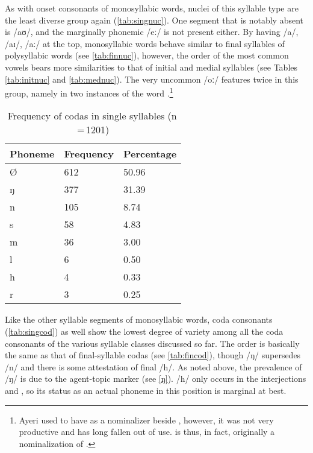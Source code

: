 As with onset consonants of monosyllabic words, nuclei of this syllable type 
are the least diverse group again (\autoref{tab:singnuc}). One segment that is 
notably absent is /aʊ/, and the marginally phonemic /eː/ is not present either. 
By having /a/, /aɪ/, /aː/ at the top, monosyllabic words behave similar to 
final syllables of polysyllabic words (see \autoref{tab:finnuc}), however, the 
order of the most common vowels bears more similarities to that of initial and 
medial syllables (see Tables \ref{tab:initnuc} and \ref{tab:mednuc}). The very 
uncommon /oː/ features twice in this group, namely in two instances of the word 
.\footnote{Ayeri used to have  
as a nominalizer beside , however, it was not very productive and 
has long fallen out of use.  is thus, in fact, originally a 
nominalization of .}

\begin{table}[pth]\centering
\caption[Frequency of codas in single syllables]{Frequency of codas in single syllables (n\,=\,1201)}
\begin{tabu} to 0.5\textwidth{X X[c] X[c]}
\tableheaderfont\toprule
Phoneme
	& Frequency
	& Percentage
	\\
	
\toprule

Ø
	& 612
	& 50.96\pct\\

\midrule

ŋ
	& 377
	& 31.39\pct\\
n
	& 105
	& 8.74\pct\\
s
	& 58
	& 4.83\pct\\
m
	& 36
	& 3.00\pct\\
l
	& 6
	& 0.50\pct\\
h
	& 4
	& 0.33\pct\\
r
	& 3
	& 0.25\pct\\

\bottomrule
\end{tabu}
\label{tab:singcod}
\end{table}

Like the other syllable segments of monosyllabic words, coda consonants 
(\autoref{tab:singcod}) as well show the lowest degree of variety among all the 
coda consonants of the various syllable classes discussed so far. The order is 
basically the same as that of final-syllable codas (see \autoref{tab:fincod}), 
though /ŋ/ supersedes /n/ and there is some attestation of final /h/. As noted 
above, the prevalence of /ŋ/ is due to the agent-topic marker  
(see \autoref{ŋ}). /h/ only occurs in the interjections  and 
, so its status as an actual phoneme in this position is 
marginal at best.

